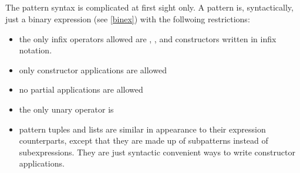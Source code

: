 \begin{flushleft}
  \sym{::}  \alt{} \\
   
  \alt {}\\
  \sym{:} 
  \alt {}\\
   
  \alt {} \\
  
  \alt {}\\
 \sym{!}  \alt{}  \\
     
    \alt {} \sym{\{}  \sym{\}}
    \alt {}        
    \alt {}
    \alt \sym{(} \sym{)}    
    \alt \sym{[} \sym{]}           
    \alt \sym{[}  \sym{]} 
    \alt  \sym{(} \sym{,} \sym{)}       
    \alt \sym{(}  \sym{)}\\    

     
    \alt \regex{\_}           \\

 

 \\
\end{flushleft}

The pattern syntax is complicated at first sight only. A pattern is, syntactically, just a binary expression (see \autoref{binex}) with the follwoing restrictions:
\begin{itemize}
\item the only infix operators allowed are , , \sym{:} and constructors written in infix notation.
\item only constructor applications are allowed
\item no partial applications are allowed
\item the only unary operator is \sym{!}
\item pattern tuples and lists are similar in appearance to their expression counterparts, except that they are made up of subpatterns instead of subexpressions. They are just syntactic convenient ways to write constructor applications.
\end{itemize}

